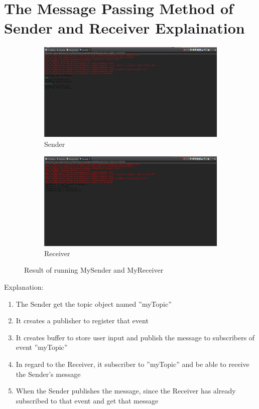 \documentclass[11pt,a4paper]{article}
\begin{document}
	\section{The Message Passing Method of Sender and Receiver Explaination}
	\label{sec:mespassexpl}
	\begin{figure}[h!]
		\centering
  		\begin{subfigure}[b]{0.4\linewidth}
  		\includegraphics[width=\linewidth]{sender-res.png}
    		\caption{Sender}
  		\end{subfigure}
  		\begin{subfigure}[b]{0.4\linewidth}
    		\includegraphics[width=\linewidth]{receiver-res.png}
    		\caption{Receiver}
  		\end{subfigure}
  		\caption{Result of running MySender and MyReceiver}
  		\label{fig:jndi}
	\end{figure}
	Explanation:
	\begin{enumerate}
		\item The Sender get the topic object named ''myTopic''
		\item It creates a publisher to register that event
		\item It creates buffer to store user input and publish the message to subscribers of event ''myTopic''
		\item In regard to the Receiver, it subscriber to ''myTopic'' and be able to receive the Sender’s message
		\item When the Sender publishes the message, since the Receiver has already subscribed to that event and get that message
	\end{enumerate}
\end{document}
